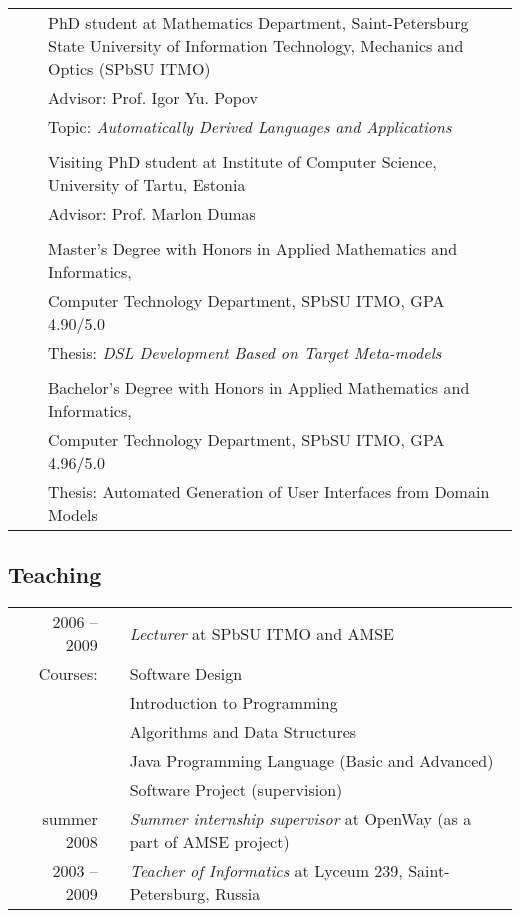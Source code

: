 \documentclass[a4paper, 12pt]{article}
\begin{document}
\begin{tabular*}{1.0\textwidth}[t]{p{70pt} l p{370pt}}
	\raggedleft{since 2007}&\hspace{10pt}&PhD student at Mathematics Department, Saint-Petersburg State University of Information Technology, Mechanics and Optics (SPbSU ITMO)\\
	&&Advisor: Prof. Igor Yu. Popov \\
	&&Topic: \textit{Automatically Derived Languages and Applications}\\
	&&\\
	\raggedleft{2009 -- 2010}&& Visiting PhD student at Institute of Computer Science, University of Tartu, Estonia\\
	&&Advisor: Prof. Marlon Dumas \\
	&&\\
	\raggedleft{2007} && Master's Degree with Honors in Applied Mathematics and Informatics, \\
	&&Computer Technology Department, SPbSU ITMO, GPA 4.90/5.0\\
	&&Thesis: \textit{DSL Development Based on Target Meta-models}\\
	&&\\
	\raggedleft{2005} && Bachelor's Degree with Honors in Applied Mathematics and Informatics, \\
	&&Computer Technology Department, SPbSU ITMO, GPA 4.96/5.0\\
	&&Thesis: Automated Generation of User Interfaces from Domain Models\\
\end{tabular*}

\subsection*{Teaching}
\begin{tabular}{ r l p{370pt} }
	2006 -- 2009 && {\it Lecturer} at SPbSU ITMO and AMSE\\%
	Courses: && Software Design\\
		 && Introduction to Programming\\
		 && Algorithms and Data Structures\\
		 && Java Programming Language (Basic and Advanced)\\
		 && Software Project (supervision)\\
	summer 2008 && {\it Summer internship supervisor} at OpenWay (as a part of AMSE project)\\%
	2003 -- 2009 && {\it Teacher of Informatics} at Lyceum 239, Saint-Petersburg, Russia\\%
\end{tabular}
\end{document}
